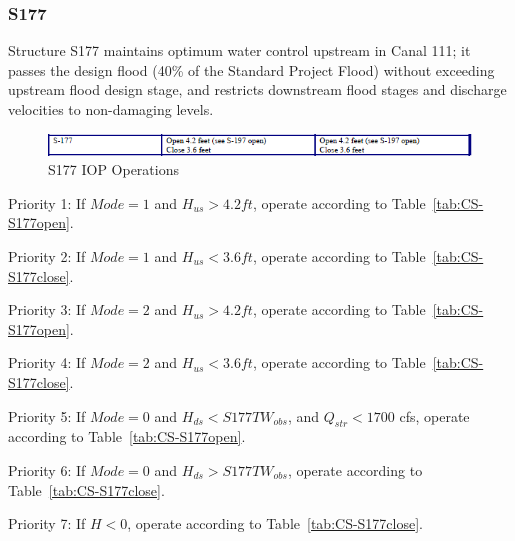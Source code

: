 

\clearpage

\subsubsection{S177}

Structure S177 maintains optimum water control upstream in Canal 111; it passes the design flood (40\% of the Standard Project Flood) without exceeding upstream flood design stage, and restricts downstream flood stages and discharge velocities to non-damaging levels.

\begin{figure}[!h]
  \begin{center}
  \includegraphics[width=6.5in]{../figs/S177_IOPops.png}
  \caption{S177 IOP Operations}
  \label{fig:S177iop}
  \end{center}
\end{figure}

\begin{packed_items}
\item Priority 1: If $Mode=1$ and $H_{us}>4.2 ft$, operate according to Table~\ref{tab:CS-S177open}.
\item Priority 2: If $Mode=1$ and $H_{us}<3.6 ft$, operate according to Table~\ref{tab:CS-S177close}.
\item[]
\item Priority 3: If $Mode=2$ and $H_{us}>4.2 ft$, operate according to Table~\ref{tab:CS-S177open}.
\item Priority 4: If $Mode=2$ and $H_{us}<3.6 ft$, operate according to Table~\ref{tab:CS-S177close}.
\item[]
\item Priority 5: If $Mode=0$ and $H_{ds}<S177TW_{obs}$, and $Q_{str}<1700$ cfs, operate according to Table~\ref{tab:CS-S177open}.
\item Priority 6: If $Mode=0$ and $H_{ds}>S177TW_{obs}$, operate according to Table~\ref{tab:CS-S177close}.
\item[]
\item Priority 7: If $H<0$, operate according to Table~\ref{tab:CS-S177close}.
\end{packed_items}

